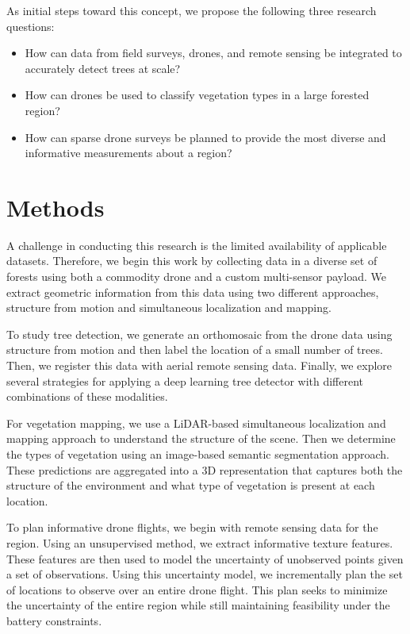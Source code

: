 As initial steps toward this concept, we propose the following three research questions:
\begin{itemize}
    \item How can data from field surveys, drones, and remote sensing be integrated to accurately detect trees at scale?
\end{itemize}
\begin{itemize}
    \item How can drones be used to classify vegetation types in a large forested region?
\end{itemize}
\begin{itemize}
    \item How can sparse drone surveys be planned to provide the most diverse and informative measurements about a region?
\end{itemize}

\section{Methods}
A challenge in conducting this research is the limited availability of applicable datasets. Therefore, we begin this work by collecting data in a diverse set of forests using both a commodity drone and a custom multi-sensor payload. We extract geometric information from this data using two different approaches, structure from motion and simultaneous localization and mapping.

To study tree detection, we generate an orthomosaic from the drone data using structure from motion and then label the location of a small number of trees. Then, we register this data with aerial remote sensing data. Finally, we explore several strategies for applying a deep learning tree detector with different combinations of these modalities.

For vegetation mapping, we use a LiDAR-based simultaneous localization and mapping approach to understand the structure of the scene. Then we determine the types of vegetation using an image-based semantic segmentation approach. These predictions are aggregated into a 3D representation that captures both the structure of the environment and what type of vegetation is present at each location.

To plan informative drone flights, we begin with remote sensing data for the region. Using an unsupervised method, we extract informative texture features. These features are then used to model the uncertainty of unobserved points given a set of observations. Using this uncertainty model, we incrementally plan the set of locations to observe over an entire drone flight. This plan seeks to minimize the uncertainty of the entire region while still maintaining feasibility under the battery constraints. 

